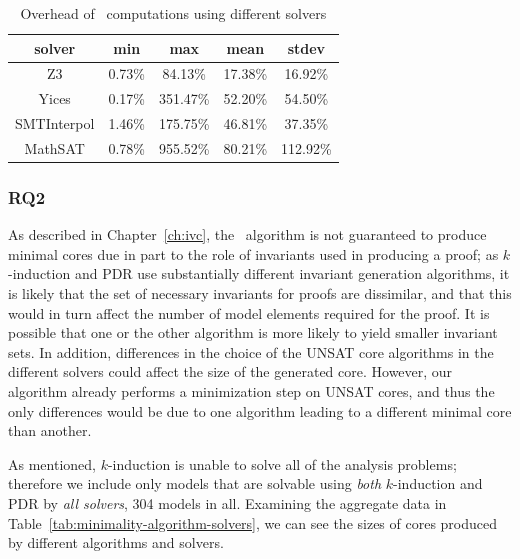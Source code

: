 \begin{table}
  \caption{Overhead of \ucalg\ computations using different solvers}
  \centering
  \begin{tabular}{ |c||c|c|c|c| }
    \hline
     solver & min & max & mean & stdev \\[0.5ex]
    \hline
    Z3   & 0.73\% & 84.13\% & 17.38\% & 16.92\% \\[0.5ex]
    Yices &   0.17\%  & 351.47\%   & 52.20\% & 54.50\% \\[0.5ex]
   SMTInterpol& 1.46\% & 175.75\% &  46.81\% & 37.35\%\\[0.5ex]
    MathSAT & 0.78\% & 955.52\% &  80.21\% & 112.92\%\\[0.5ex]
    \hline
  \end{tabular}
  \label{tab:overhead-ucalg-solvers}
\end{table}

\vspace{0.1in}
\subsubsection{RQ2}
As described in Chapter~\ref{ch:ivc}, the \ucalg\
algorithm is not guaranteed to produce minimal cores due in part to
the role of invariants used in producing a proof; as $k$-induction and
PDR use substantially different invariant generation algorithms, it is
likely that the set of necessary invariants for proofs are dissimilar,
and that this would in turn affect the number of model elements required for
the proof.  It is possible that one or the other algorithm is more likely
to yield smaller invariant sets.  In addition, differences in the choice of the
UNSAT core algorithms in the different solvers could affect the size of the
generated core. However, our algorithm already performs a minimization
step on UNSAT cores, and thus the only differences would be due to one
algorithm leading to a different minimal core than another.

As mentioned, $k$-induction is unable to solve all of the analysis problems; therefore we include only models that are solvable using {\em both} $k$-induction and PDR by {\em all solvers}, 304 models in all.  Examining the aggregate data in Table~\ref{tab:minimality-algorithm-solvers}, we can see the sizes of cores produced by different algorithms and solvers.
\vspace{0.1in}
